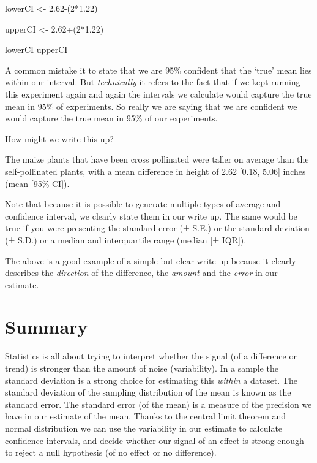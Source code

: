 \documentclass[
]{book}
\makeatletter
\newenvironment{Shaded}{\begin{snugshade}}{\end{snugshade}}
\newcommand{\DecValTok}[1]{\textcolor[rgb]{0.00,0.00,0.81}{#1}}
\newcommand{\FloatTok}[1]{\textcolor[rgb]{0.00,0.00,0.81}{#1}}
\newcommand{\NormalTok}[1]{#1}
\newcommand{\OtherTok}[1]{\textcolor[rgb]{0.56,0.35,0.01}{#1}}
\newcommand{\SpecialCharTok}[1]{\textcolor[rgb]{0.00,0.00,0.00}{#1}}
\newenvironment{kframe}{%
\medskip{}
\setlength{\fboxsep}{.8em}
 \def\at@end@of@kframe{}%
 \ifinner\ifhmode%
  \def\at@end@of@kframe{\end{minipage}}%
  \begin{minipage}{\columnwidth}%
 \fi\fi%
 \def\FrameCommand##1{\hskip\@totalleftmargin \hskip-\fboxsep
 \colorbox{shadecolor}{##1}\hskip-\fboxsep
     \hskip-\linewidth \hskip-\@totalleftmargin \hskip\columnwidth}%
 \MakeFramed {\advance\hsize-\width
   \@totalleftmargin\z@ \linewidth\hsize
   \@setminipage}}%
 {\par\unskip\endMakeFramed%
 \at@end@of@kframe}
\newenvironment{block}[1]
  {
  \begin{itemize}
  \renewcommand{\labelitemi}{
    \raisebox{-.7\height}[0pt][0pt]{
      {\setkeys{Gin}{width=3em,keepaspectratio}\texttt{[image: images/\#1]}}
    }
  }
  \setlength{\fboxsep}{1em}
  \begin{kframe}
  \item
  }
  {
  \end{kframe}
  \end{itemize}
  }
\newenvironment{rmdnote}
  {\begin{block}{note}}
  {\end{block}}
\makeatother
\begin{document}
\begin{Shaded}
\begin{Highlighting}[]
\NormalTok{lowerCI }\OtherTok{\textless{}{-}} \FloatTok{2.62}\SpecialCharTok{{-}}\NormalTok{(}\DecValTok{2}\SpecialCharTok{*}\FloatTok{1.22}\NormalTok{)}

\NormalTok{upperCI }\OtherTok{\textless{}{-}} \FloatTok{2.62}\SpecialCharTok{+}\NormalTok{(}\DecValTok{2}\SpecialCharTok{*}\FloatTok{1.22}\NormalTok{)}

\NormalTok{lowerCI}
\NormalTok{upperCI}
\end{Highlighting}
\end{Shaded}

A common mistake it to state that we are 95\% confident that the `true' mean lies within our interval. But \emph{technically} it refers to the fact that if we kept running this experiment again and again the intervals we calculate would capture the true mean in 95\% of experiments. So really we are saying that we are confident we would capture the true mean in 95\% of our experiments.

How might we write this up?

\begin{rmdnote}
The maize plants that have been cross pollinated were taller on average
than the self-pollinated plants, with a mean difference in height of
2.62 {[}0.18, 5.06{]} inches (mean {[}95\% CI{]}).
\end{rmdnote}

Note that because it is possible to generate multiple types of average and confidence interval, we clearly state them in our write up. The same would be true if you were presenting the standard error (± S.E.) or the standard deviation (± S.D.) or a median and interquartile range (median {[}± IQR{]}).

The above is a good example of a simple but clear write-up because it clearly describes the \emph{direction} of the difference, the \emph{amount} and the \emph{error} in our estimate.

\hypertarget{summary}{%
\section{Summary}\label{summary}}

Statistics is all about trying to interpret whether the signal (of a difference or trend) is stronger than the amount of noise (variability). In a sample the standard deviation is a strong choice for estimating this \emph{within} a dataset. The standard deviation of the sampling distribution of the mean is known as the standard error. The standard error (of the mean) is a measure of the precision we have in our estimate of the mean. Thanks to the central limit theorem and normal distribution we can use the variability in our estimate to calculate confidence intervals, and decide whether our signal of an effect is strong enough to reject a null hypothesis (of no effect or no difference).
\end{document}
